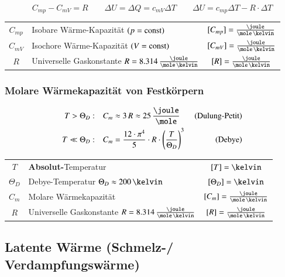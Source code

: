\vspace{-0.2cm}

$$ \boxed{ C_{mp} - C_{mV} = R } \qquad \Delta U = \Delta Q = c_{mV}\Delta T 
\qquad \Delta U = c_{mp} \Delta T - R \cdot \Delta T$$

\renewcommand{\arraystretch}{1.3}
\begin{tabular}{c l c}
	$C_{mp}$ 	& Isobare Wärme-Kapazität $(p = \mathop{} \! \mathrm{const})$ 									& $[C_{mp}] = \frac{\joule}{\mole \, \kelvin}$	\\
	$C_{mV}$ 	& Isochore Wärme-Kapazität $(V = \mathop{} \! \mathrm{const})$ 									& $[C_{mV}] = \frac{\joule}{\mole \, \kelvin}$	\\
	$R$			& Universelle Gaskonstante $R = 8.314 \, \frac{\joule}{\mole \, \kelvin}$ 	& $[R] = \frac{\joule}{\mole \, \kelvin}$
\end{tabular}
\renewcommand{\arraystretch}{1}


\subsubsection{Molare Wärmekapazität von Festkörpern}

\vspace{-0.4cm}

\begin{align*}
	T > \Theta_D: 	\quad &C_m \approx 3 \, R \approx 25 \, \frac{\joule}{\mole}  &\text{ (Dulung-Petit)} \\
	T \ll \Theta_D:	\quad &C_m = \frac{12 \cdot \pi^4}{5}  \cdot R \cdot  \Bigg( \frac{T}{\Theta_D}  \Bigg)^3  &\text{ (Debye)} 
\end{align*}


\renewcommand{\arraystretch}{1.3}
\begin{tabular}{c l c}
	$T$ 		& \textbf{Absolut-}Temperatur 												& $[T] = \kelvin$ 							\\
	$\Theta_D$ 	& Debye-Temperatur $\Theta_D \approx 200 \, \kelvin$ 						& $[\Theta_D] = \kelvin$ 					\\
	$C_m$ 		& Molare Wärmekapazität 													& $[C_m] = \frac{\joule}{\mole \, \kelvin}$ \\
	$R$			& Universelle Gaskonstante $R = 8.314 \, \frac{\joule}{\mole \, \kelvin}$ 	& $[R] = \frac{\joule}{\mole \, \kelvin}$
\end{tabular}
\renewcommand{\arraystretch}{1}


\subsection{Latente Wärme (Schmelz-/ Verdampfungswärme)}

